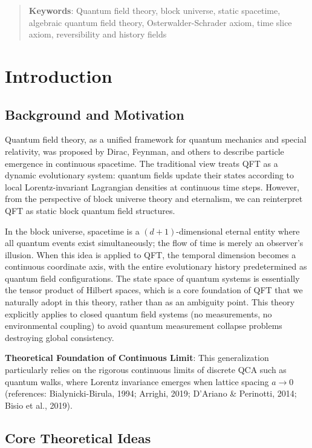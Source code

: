 \documentclass[11pt]{article}
\theoremstyle{definition}
\theoremstyle{remark}
\begin{document}
\begin{abstract}
\noindent\textbf{Keywords}: Quantum field theory, block universe, static spacetime, algebraic quantum field theory, Osterwalder-Schrader axiom, time slice axiom, reversibility and history fields
\end{abstract}

\section{Introduction}

\subsection{Background and Motivation}

Quantum field theory, as a unified framework for quantum mechanics and special relativity, was proposed by Dirac, Feynman, and others to describe particle emergence in continuous spacetime. The traditional view treats QFT as a dynamic evolutionary system: quantum fields update their states according to local Lorentz-invariant Lagrangian densities at continuous time steps. However, from the perspective of block universe theory and eternalism, we can reinterpret QFT as static block quantum field structures.

In the block universe, spacetime is a \( (d+1) \)-dimensional eternal entity where all quantum events exist simultaneously; the flow of time is merely an observer's illusion. When this idea is applied to QFT, the temporal dimension becomes a continuous coordinate axis, with the entire evolutionary history predetermined as quantum field configurations. The state space of quantum systems is essentially the tensor product of Hilbert spaces, which is a core foundation of QFT that we naturally adopt in this theory, rather than as an ambiguity point. This theory explicitly applies to closed quantum field systems (no measurements, no environmental coupling) to avoid quantum measurement collapse problems destroying global consistency.

\textbf{Theoretical Foundation of Continuous Limit}: This generalization particularly relies on the rigorous continuous limits of discrete QCA such as quantum walks, where Lorentz invariance emerges when lattice spacing \( a \to 0 \) (references: Bialynicki-Birula, 1994; Arrighi, 2019; D'Ariano \& Perinotti, 2014; Bisio et al., 2019).

\subsection{Core Theoretical Ideas}
\end{document}
